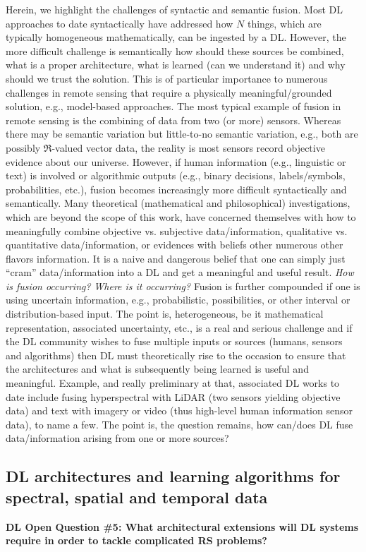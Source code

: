 \documentclass[12pt]{spieman}
\newcommand{\ParSection}[1]{}
\begin{document}
\begin{spacing}{1}
Herein, we highlight the challenges of syntactic and semantic fusion. Most DL approaches to date syntactically have addressed how $N$ things, which are typically homogeneous mathematically, can be ingested by a DL. However, the more difficult challenge is semantically how should these sources be combined, what is a proper architecture, what is learned (can we understand it) and why should we trust the solution. This is of particular importance to numerous challenges in remote sensing that require a physically meaningful/grounded solution, e.g., model-based approaches. The most typical example of fusion in remote sensing is the combining of data from two (or more) sensors. Whereas there may be semantic variation but little-to-no semantic variation, e.g., both are possibly $\Re$-valued vector data, the reality is most sensors record objective evidence about our universe. However, if human information (e.g., linguistic or text) is involved or algorithmic outputs (e.g., binary decisions, labels/symbols, probabilities, etc.), fusion becomes increasingly more difficult syntactically and semantically. Many theoretical (mathematical and philosophical) investigations, which are beyond the scope of this work, have concerned themselves with how to meaningfully combine objective vs. subjective data/information, qualitative vs. quantitative data/information, or evidences with beliefs other numerous other flavors information. It is a naive and dangerous belief that one can simply just ``cram'' data/information into a DL and get a meaningful and useful result. \textit{How is fusion occurring?} \textit{Where is it occurring?} Fusion is further compounded if one is using uncertain information, e.g., probabilistic, possibilities, or other interval or distribution-based input. The point is, heterogeneous, be it mathematical representation, associated uncertainty, etc., is a real and serious challenge and if the DL community wishes to fuse multiple inputs or sources (humans, sensors and algorithms) then DL must theoretically rise to the occasion to ensure that the architectures and what is subsequently being learned is useful and meaningful. Example, and really preliminary at that, associated DL works to date include fusing hyperspectral with LiDAR \cite{7786851} (two sensors yielding objective data) and text with imagery or video \cite{conficmlNgiamKKNLN11} (thus high-level human information sensor data), to name a few. The point is, the question remains, how can/does DL fuse data/information arising from one or more sources?

\subsection{DL architectures and learning algorithms for spectral, spatial and temporal data} \label{subsec:ChallengesOpportunities_v}
\ParSection{Optimal architectures and architectural extensions}
\textbf{DL Open Question \#5: What architectural extensions will DL systems require in order to tackle complicated RS problems?}


\end{spacing}
\end{document}
